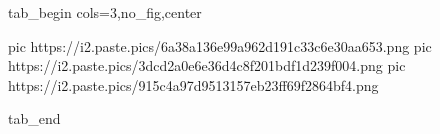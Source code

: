  
 
 
 
 


\ifcmt
  tab_begin cols=3,no_fig,center

     pic https://i2.paste.pics/6a38a136e99a962d191c33c6e30aa653.png
		 pic https://i2.paste.pics/3dcd2a0e6e36d4c8f201bdf1d239f004.png
		 pic https://i2.paste.pics/915c4a97d9513157eb23ff69f2864bf4.png

  tab_end
\fi
